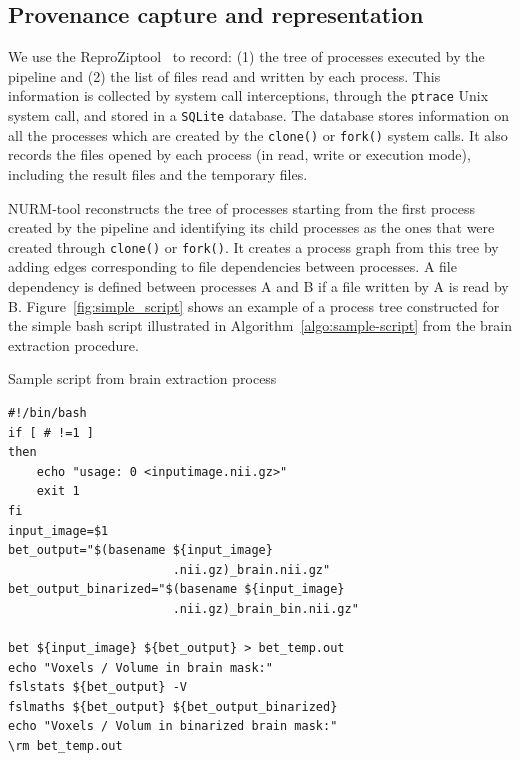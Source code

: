 \documentclass[a4paper,num-refs]{oup-contemporary}
\newcommand{\reprozip}[0]{ReproZip}
\begin{document}
\subsection{Provenance capture and representation}

We use the \reprozip tool~\cite{Chirigati2016} to record: (1) 
the tree of processes executed by the pipeline and (2) the list of 
files read and written by each process. This information is collected 
by system call interceptions, through the \texttt{ptrace} Unix system 
call, and stored in a \texttt{SQLite} database. The database stores 
information on all the processes which are created by the 
\texttt{clone()} or \texttt{fork()} system calls. It also records the 
files opened by each process (in read, write or execution mode), 
including the result files and the temporary files.

NURM-tool reconstructs the tree of processes starting from the first process 
created by the pipeline and identifying its child processes as the ones 
that were created through \texttt{clone()} or \texttt{fork()}. It 
creates a process graph from this tree by adding edges corresponding to 
file dependencies between processes. A file dependency is defined 
between processes A and B if a file written by A is read by B. 
Figure~\ref{fig:simple_script} shows an example of a process tree 
constructed for the simple bash script illustrated in 
Algorithm~\ref{algo:sample-script} from the brain extraction procedure.


\begin{algorithm}[h!]
\caption{Sample script from brain extraction process}
\label{algo:sample-script}
\begin{verbatim}
#!/bin/bash
if [ # !=1 ]
then
    echo "usage: 0 <inputimage.nii.gz>"
    exit 1
fi
input_image=$1
bet_output="$(basename ${input_image} 
                       .nii.gz)_brain.nii.gz"
bet_output_binarized="$(basename ${input_image} 
                       .nii.gz)_brain_bin.nii.gz"

bet ${input_image} ${bet_output} > bet_temp.out
echo "Voxels / Volume in brain mask:"
fslstats ${bet_output} -V
fslmaths ${bet_output} ${bet_output_binarized}
echo "Voxels / Volum in binarized brain mask:"
\rm bet_temp.out
\end{verbatim}
\end{algorithm}
\end{document}
